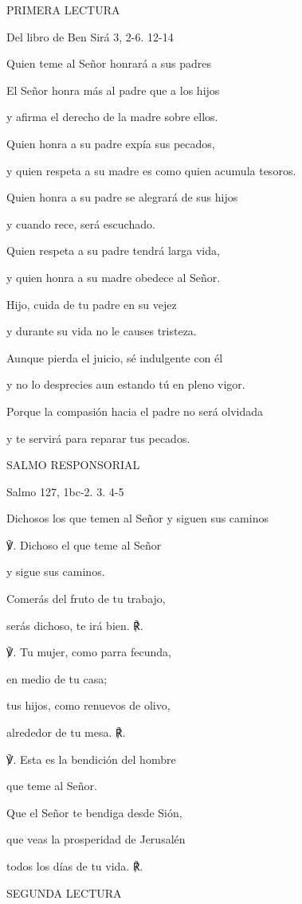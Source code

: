 \begin{body}
\begin{body}
PRIMERA LECTURA

Del libro de Ben Sirá 3, 2-6. 12-14

Quien teme al Señor honrará a sus padres

El Señor honra más al padre que a los hijos

y afirma el derecho de la madre sobre ellos.

Quien honra a su padre expía sus pecados,

y quien respeta a su madre es como quien acumula tesoros.

Quien honra a su padre se alegrará de sus hijos

y cuando rece, será escuchado.

Quien respeta a su padre tendrá larga vida,

y quien honra a su madre obedece al Señor.

Hijo, cuida de tu padre en su vejez

y durante su vida no le causes tristeza.

Aunque pierda el juicio, sé indulgente con él

y no lo desprecies aun estando tú en pleno vigor.

Porque la compasión hacia el padre no será olvidada

y te servirá para reparar tus pecados.

SALMO RESPONSORIAL

Salmo 127, 1bc-2. 3. 4-5

Dichosos los que temen al Señor y siguen sus caminos

℣. Dichoso el que teme al Señor

y sigue sus caminos.

Comerás del fruto de tu trabajo,

serás dichoso, te irá bien. ℟.

℣. Tu mujer, como parra fecunda,

en medio de tu casa;

tus hijos, como renuevos de olivo,

alrededor de tu mesa. ℟.

℣. Esta es la bendición del hombre

que teme al Señor.

Que el Señor te bendiga desde Sión,

que veas la prosperidad de Jerusalén

todos los días de tu vida. ℟.

SEGUNDA LECTURA


\end{body}
\end{body}
